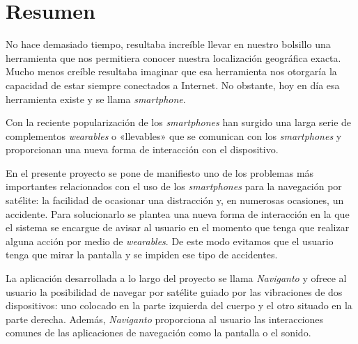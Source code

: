 \chapter{Resumen}

No hace demasiado tiempo, resultaba increíble llevar en nuestro bolsillo una herramienta que nos
permitiera conocer nuestra localización geográfica exacta. Mucho menos creíble resultaba imaginar
que esa herramienta nos otorgaría la capacidad de estar siempre conectados a Internet. No
obstante, hoy en día esa herramienta existe y se llama \emph{smartphone}.

Con la reciente popularización de los \emph{smartphones} han surgido una larga serie de complementos
\emph{wearables} o «llevables» que se comunican con los \emph{smartphones} y proporcionan una nueva
forma de interacción con el dispositivo.

En el presente proyecto se pone de manifiesto uno de los problemas más importantes relacionados con
el uso de los \emph{smartphones} para la navegación por satélite: la facilidad de ocasionar una
distracción y, en numerosas ocasiones, un accidente. Para solucionarlo se plantea una nueva forma de
interacción en la que el sistema se encargue de avisar al usuario en el momento que tenga que
realizar alguna acción por medio de \emph{wearables}. De este modo evitamos que el usuario tenga que
mirar la pantalla y se impiden ese tipo de accidentes.

La aplicación desarrollada a lo largo del proyecto se llama \emph{Naviganto} y ofrece al usuario la
posibilidad de navegar por satélite guiado por las vibraciones de dos dispositivos: uno colocado en
la parte izquierda del cuerpo y el otro situado en la parte derecha. Además, \emph{Naviganto}
proporciona al usuario las interacciones comunes de las aplicaciones de navegación como la pantalla
o el sonido.

